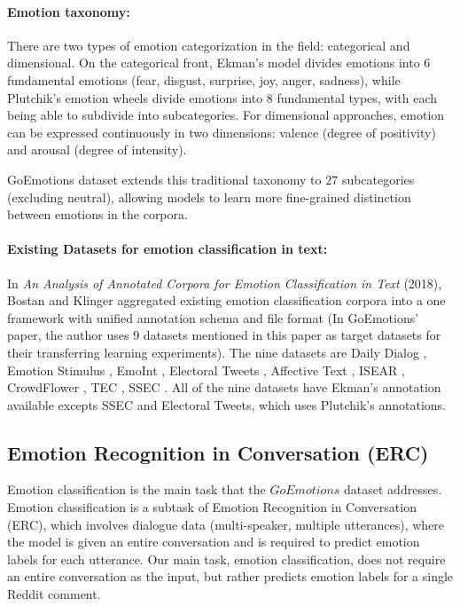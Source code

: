 \documentclass{article}
\begin{document}
\paragraph{Emotion taxonomy: } There are two types of emotion categorization in the field: categorical and dimensional. On the categorical front, Ekman's model divides emotions into 6 fundamental emotions (fear, disgust, surprise, joy, anger, sadness), while Plutchik's emotion wheels divide emotions into 8 fundamental types, with each being able to subdivide into subcategories. For dimensional approaches, emotion can be expressed continuously in two dimensions: valence (degree of positivity) and arousal (degree of intensity).

GoEmotions dataset extends this traditional taxonomy to $27$ subcategories (excluding neutral), allowing models to learn more fine-grained distinction between emotions in the corpora. 

\paragraph{Existing Datasets for emotion classification in text: } In \textit{An Analysis of Annotated Corpora for Emotion Classification in Text} (2018), Bostan and Klinger aggregated existing emotion classification corpora into a one framework with unified annotation schema and file format (In GoEmotions' paper, the author uses $9$ datasets mentioned in this paper as target datasets for their transferring learning experiments). The nine datasets are Daily Dialog \cite{dataset-DailyDialog}, Emotion Stimulus \cite{dataset-EmotionStimulus}, EmoInt \cite{dataset-EmoInt}, Electoral Tweets \cite{dataset-Electoral Tweets}, Affective Text \cite{dataset-Affective text}, ISEAR \cite{dataset-ISEAR}, CrowdFlower \cite{dataset-CrowdFlower}, TEC \cite{dataset-TEC}, SSEC \cite{dataset-SSEC}. All of the nine datasets have Ekman's annotation available excepts SSEC and Electoral Tweets, which uses Plutchik's annotations. 

\subsection{Emotion Recognition in Conversation (ERC)}
Emotion classification is the main task that the $GoEmotions$ dataset addresses. Emotion classification is a subtask of Emotion Recognition in Conversation (ERC), which involves dialogue data (multi-speaker, multiple utterances), where the model is given an entire conversation and is required to predict emotion labels for each utterance. Our main task, emotion classification, does not require an entire conversation as the input, but rather predicts emotion labels for a single Reddit comment. 
\end{document}
